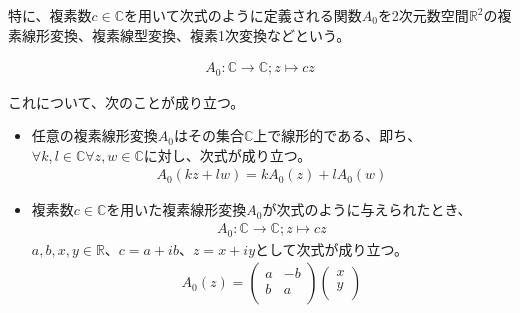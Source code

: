 \documentclass[dvipdfmx]{jsarticle}
\begin{document}
\begin{dfn}
特に、複素数$c \in \mathbb{C}$を用いて次式のように定義される関数$A_{0}$を2次元数空間$\mathbb{R}^{2}$の複素線形変換、複素線型変換、複素1次変換などという。
\end{dfn}
\begin{align*}
A_{0}:\mathbb{C} \rightarrow \mathbb{C};z \mapsto cz
\end{align*}
\begin{thm}\label{4.2.8.2} これについて、次のことが成り立つ。
\begin{itemize}
\item
  任意の複素線形変換$A_{0}$はその集合$\mathbb{C}$上で線形的である、即ち、$\forall k,l \in \mathbb{C}\forall z,w \in \mathbb{C}$に対し、次式が成り立つ。
\begin{align*}
A_{0}(kz + lw) = kA_{0}(z) + lA_{0}(w)
\end{align*}
\item
  複素数$c \in \mathbb{C}$を用いた複素線形変換$A_{0}$が次式のように与えられたとき、
\begin{align*}
A_{0}:\mathbb{C} \rightarrow \mathbb{C};z \mapsto cz
\end{align*}
$a,b,x,y \in \mathbb{R}$、$c = a + ib$、$z = x + iy$として次式が成り立つ。
\begin{align*}
A_{0}(z) = \begin{pmatrix}
a & - b \\
b & a \\
\end{pmatrix}\begin{pmatrix}
x \\
y \\
\end{pmatrix}
\end{align*}
\end{itemize}
\end{thm}
\end{document}
